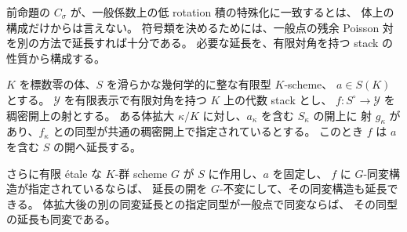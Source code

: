 前命題の $C_\sigma$ が、一般係数上の低 rotation 積の特殊化に一致するとは、
体上の構成だけからは言えない。
符号類を決めるためには、一般点の残余 Poisson 対を別の方法で延長すれば十分である。
必要な延長を、有限対角を持つ stack の性質から構成する。

\begin{lemma}[有限対角を持つ標的への有理射の延長]
\label{lem:nfm-finite-diagonal-rational-extension}
\label{lem:nfm-finite-etale-equivariant-extension}
$K$ を標数零の体、$S$ を滑らかな幾何学的に整な有限型 $K$-scheme、
$a\in S(K)$ とする。
$\mathcal Y$ を有限表示で有限対角を持つ $K$ 上の代数 stack とし、
$f:S^\circ\to\mathcal Y$ を稠密開上の射とする。
ある体拡大 $\kappa/K$ に対し、$a_\kappa$ を含む $S_\kappa$ の開上に
射 $g_\kappa$ があり、$f_\kappa$ との同型が共通の稠密開上で指定されているとする。
このとき $f$ は $a$ を含む $S$ の開へ延長する。

さらに有限 \'etale な $K$-群 scheme $G$ が $S$ に作用し、$a$ を固定し、
$f$ に $G$-同変構造が指定されているならば、
延長の開を $G$-不変にして、その同変構造も延長できる。
体拡大後の別の同変延長との指定同型が一般点で同変ならば、
その同型の延長も同変である。
\end{lemma}


